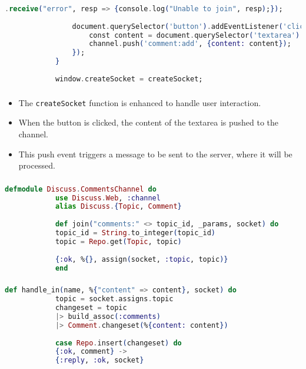\documentclass[aspectratio=169, table]{beamer}
\begin{document}
	\begin{frame}[fragile]
		\frametitle{}
		\begin{lstlisting}[language=Elixir]
				.receive("error", resp => {console.log("Unable to join", resp);});
				
				document.querySelector('button').addEventListener('click', () => {
					const content = document.querySelector('textarea').value;
					channel.push('comment:add', {content: content});
				});
			}
			
			window.createSocket = createSocket;
		\end{lstlisting}
	\end{frame}
	
	\begin{frame}[fragile]
		\frametitle{}
	\begin{itemize}
		\item The \texttt{createSocket} function is enhanced to handle user interaction.
		\item When the button is clicked, the content of the textarea is pushed to the channel.
		\item This push event triggers a message to be sent to the server, where it will be processed.
	\end{itemize}
	\end{frame}
	
	\begin{frame}[fragile]
		\frametitle{}
		\begin{lstlisting}[language=Elixir]
			defmodule Discuss.CommentsChannel do 
			use Discuss.Web, :channel
			alias Discuss.{Topic, Comment}
			
			def join("comments:" <> topic_id, _params, socket) do
			topic_id = String.to_integer(topic_id)
			topic = Repo.get(Topic, topic)
			
			{:ok, %{}, assign(socket, :topic, topic)}
			end
		\end{lstlisting}
	\end{frame}
	
	\begin{frame}[fragile]
		\frametitle{}
		\begin{lstlisting}[language=Elixir]
			def handle_in(name, %{"content" => content}, socket) do
			topic = socket.assigns.topic
			changeset = topic
			|> build_assoc(:comments)
			|> Comment.changeset(%{content: content})
			
			case Repo.insert(changeset) do
			{:ok, comment} ->
			{:reply, :ok, socket}
		\end{lstlisting}
	\end{frame}
	
\end{document}
